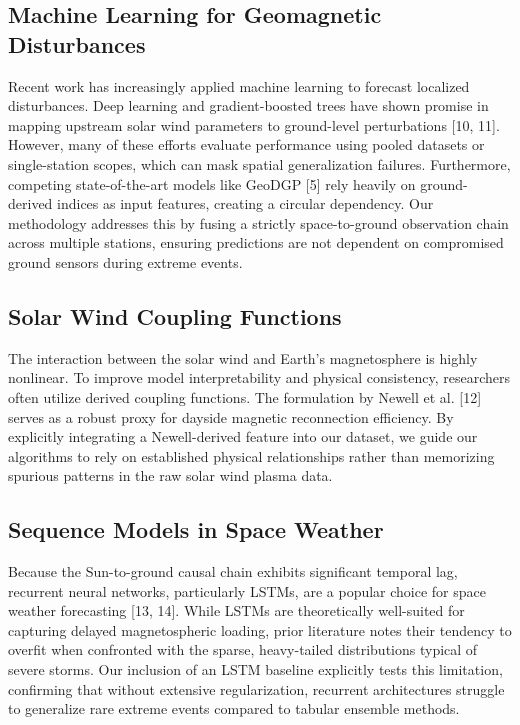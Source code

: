 \documentclass[conference]{IEEEtran}
\begin{document}
\subsection{Machine Learning for Geomagnetic Disturbances}
Recent work has increasingly applied machine learning to forecast localized disturbances. Deep learning and gradient-boosted trees have shown promise in mapping upstream solar wind parameters to ground-level perturbations [10, 11]. However, many of these efforts evaluate performance using pooled datasets or single-station scopes, which can mask spatial generalization failures. Furthermore, competing state-of-the-art models like GeoDGP [5] rely heavily on ground-derived indices as input features, creating a circular dependency. Our methodology addresses this by fusing a strictly space-to-ground observation chain across multiple stations, ensuring predictions are not dependent on compromised ground sensors during extreme events.

\subsection{Solar Wind Coupling Functions}
The interaction between the solar wind and Earth's magnetosphere is highly nonlinear. To improve model interpretability and physical consistency, researchers often utilize derived coupling functions. The formulation by Newell et al. [12] serves as a robust proxy for dayside magnetic reconnection efficiency. By explicitly integrating a Newell-derived feature into our dataset, we guide our algorithms to rely on established physical relationships rather than memorizing spurious patterns in the raw solar wind plasma data.

\subsection{Sequence Models in Space Weather}
Because the Sun-to-ground causal chain exhibits significant temporal lag, recurrent neural networks, particularly LSTMs, are a popular choice for space weather forecasting [13, 14]. While LSTMs are theoretically well-suited for capturing delayed magnetospheric loading, prior literature notes their tendency to overfit when confronted with the sparse, heavy-tailed distributions typical of severe storms. Our inclusion of an LSTM baseline explicitly tests this limitation, confirming that without extensive regularization, recurrent architectures struggle to generalize rare extreme events compared to tabular ensemble methods.
\end{document}
